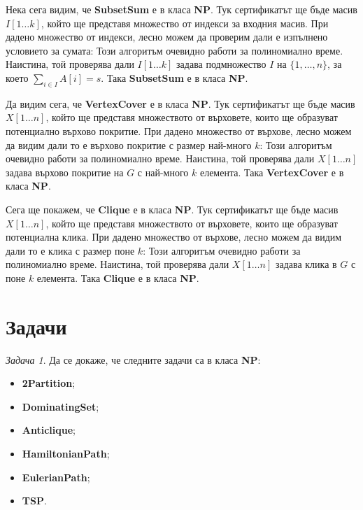 \documentclass{article}
\theoremstyle{definition}
\theoremstyle{plain}
\theoremstyle{remark}
\newtheorem{problem}{Задача}
\theoremstyle{definition}
\begin{document}
Нека сега видим, че \textbf{SubsetSum} е в класа \textbf{NP}.
Тук сертификатът ще бъде масив $I[1 \dots k]$, който ще представя множество от индекси за входния масив.
При дадено множество от индекси, лесно можем да проверим дали е изпълнено условието за сумата:
Този алгоритъм очевидно работи за полиномиално време.
Наистина, той проверява дали $I[1 \dots k]$ задава подмножество $I$ на $\{ 1, \dots, n \}$, за което $\sum\limits_{i \in I} A[i] = s$.
Така \textbf{SubsetSum} е в класа \textbf{NP}.

\pagebreak

Да видим сега, че \textbf{VertexCover} е в класа \textbf{NP}.
Тук сертификатът ще бъде масив $X[1 \dots n]$, който ще представя множеството от върховете, които ще образуват потенциално върхово покритие.
При дадено множество от върхове, лесно можем да видим дали то е върхово покритие с размер най-много $k$:
Този алгоритъм очевидно работи за полиномиално време.
Наистина, той проверява дали $X[1 \dots n]$ задава върхово покритие на $G$ с най-много $k$ елемента.
Така \textbf{VertexCover} е в класа \textbf{NP}.

Сега ще покажем, че \textbf{Clique} е в класа \textbf{NP}.
Тук сертификатът ще бъде масив $X[1 \dots n]$, който ще представя множеството от върховете, които ще образуват потенциална клика.
При дадено множество от върхове, лесно можем да видим дали то е клика с размер поне $k$:
Този алгоритъм очевидно работи за полиномиално време.
Наистина, той проверява дали $X[1 \dots n]$ задава клика в $G$ с поне $k$ елемента.
Така \textbf{Clique} е в класа \textbf{NP}.

\section*{Задачи}

\begin{problem}
Да се докаже, че следните задачи са в класа \textbf{NP}:
\begin{itemize}
    \item \textbf{2Partition};
    \item \textbf{DominatingSet};
    \item \textbf{Anticlique};
    \item \textbf{HamiltonianPath};
    \item \textbf{EulerianPath};
    \item \textbf{TSP}.
\end{itemize}
\end{problem}
\end{document}
